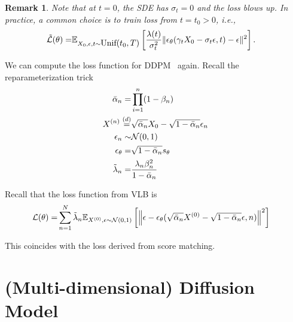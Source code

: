 \documentclass[11pt]{article}
\newtheorem{remark}{Remark}
\begin{document}
\begin{remark}
    Note that at $t=0$, the SDE has $\sigma_t=0$ and the loss blows up.
    In practice, a common choice is to train loss from $t=t_0>0$, i.e.,
    \begin{align}
        \tilde{{\cal L}}(\theta) 
        =& \mathbb{E}_{X_0, \epsilon, t\sim\mbox{Unif$(t_0,T)$}}\left[\frac{\lambda(t)}{\sigma_t^2} \| \epsilon_\theta(\gamma_tX_0 - \sigma_t\epsilon, t) - \epsilon\|^2 \right].
    \end{align}
\end{remark}


We can compute the loss function for DDPM~\cite{ho2020denoising} again.
Recall the reparameterization trick
\begin{align}
\bar{\alpha}_n =& \prod_{i=1}^n (1-\beta_n)\\
X^{(n)} \stackrel{(d)}{=} & \sqrt{\bar{\alpha}_n} X_0 - \sqrt{1-\bar{\alpha}_n} \epsilon_n\\
\epsilon_n \sim& {\cal N}(0, 1)\\
\epsilon_\theta =& \sqrt{1-\bar{\alpha}_n} s_{\theta}\\
\tilde{\lambda}_n =& \frac{\lambda_n \beta_n^2}{1-\bar{\alpha}_n}
\end{align}

Recall that the loss function from VLB is
\begin{align}
    {\cal L}(\theta)
    =&\sum_{n=1}^N \tilde{\lambda}_n \mathbb{E}_{X^{(0)}, \epsilon\sim{\cal N}(0, 1)}\left[\left\| \epsilon - \epsilon_{\theta}(\sqrt{\bar{\alpha}_n}X^{(0)} - \sqrt{1-\bar{\alpha}_n}\epsilon, n)\right\|^2\right]
\end{align}

This coincides with the loss derived from score matching.


\section{(Multi-dimensional) Diffusion Model}
\end{document}
